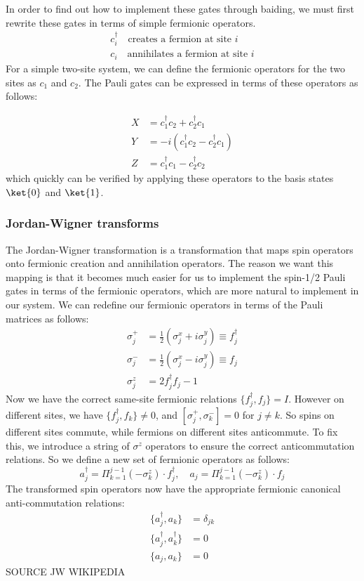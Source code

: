 In order to find out how to implement these gates through baiding, we must first rewrite these gates in terms of simple fermionic operators. 
\begin{align*}
  c_i ^{†} \quad \text{creates a fermion at site } i \\
  c_i \quad \text{annihilates a fermion at site } i
\end{align*}
For a simple two-site system, we can define the fermionic operators for the two sites as $c_1$ and $c_2$. The Pauli gates can be expressed in terms of these operators as follows:

\begin{align*}
  X &= c_1 ^{†} c_2 + c_2 ^{†} c_1 \\
  Y &= -i(c_1 ^{†} c_2 - c_2 ^{†} c_1) \\
  Z &= c_1 ^{†} c_1 - c_2 ^{†} c_2
\end{align*}
which quickly can be verified by applying these operators to the basis states $\ket{0}$ and $\ket{1}$.




\subsubsection{Jordan-Wigner transforms}
The Jordan-Wigner transformation is a transformation that maps spin operators onto fermionic creation and annihilation operators. The reason we want this mapping is that it becomes much easier for us to implement the spin-1/2 Pauli gates in terms of the fermionic operators, which are more natural to implement in our system. We can redefine our fermionic operators in terms of the Pauli matrices as follows:
\begin{align*}
σ_j^+ &= \frac{1}{2}(σ_j^x + iσ_j^y) \equiv f_j ^{†} \\
σ_j^- &= \frac{1}{2}(σ_j^x - iσ_j^y) \equiv f_j \\
σ_j^z &= 2f_j ^{†} f_j - 1
\end{align*}
Now we have the correct same-site fermionic relations $\{f_j ^{†} , f_j\} = I$. However on different sites, we have $\{f_j ^{†} , f_k\} \neq 0$, and $[σ_j^+,σ_k^-] = 0$ for $j \neq k$. So spins on different sites commute, while fermions on different sites anticommute. To fix this, we introduce a string of $σ^z$ operators to ensure the correct anticommutation relations. So we define a new set of fermionic operators as follows:
\begin{equation}
  a_j^{†} = Π_{k=1}^{j-1} (-σ_k^z) ⋅ f_j^{†}, \quad a_j = Π_{k=1}^{j-1} (-σ_k^z) ⋅ f_j
\end{equation}
The transformed spin operators now have the appropriate fermionic canonical anti-commutation relations:
\begin{align*}
\{a_j^{†}, a_k\} &= δ_{jk} \\
\{a_j^{†}, a_k^{†}\} &= 0 \\
\{a_j, a_k\} &= 0
\end{align*}
{\color{red} SOURCE JW WIKIPEDIA}\\ 
